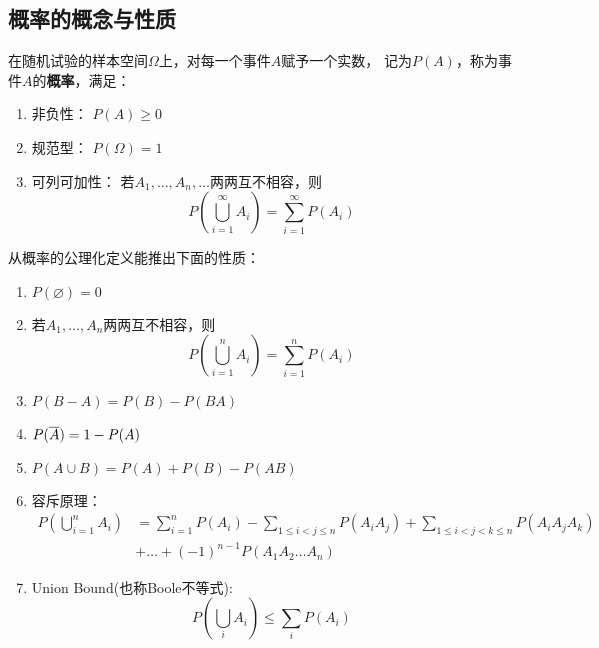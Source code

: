 \subsection{概率的概念与性质}
\begin{definition}[概率]
  在随机试验的样本空间$\Omega$上，对每一个事件$A$赋予一个实数，
  记为$P(A)$，称为事件$A$的\textbf{概率}，满足：
  \begin{enumerate}
    \item 非负性：
    $P(A)\ge 0$
    \item 规范型：
    $P(\Omega) = 1$
    \item 可列可加性：
    若$A_1,\dots,A_n,\dots$两两互不相容，则
    \begin{displaymath}
      P\left(\bigcup_{i=1}^\infty A_i\right)=\sum_{i=1}^\infty P(A_i)
    \end{displaymath}
  \end{enumerate}
\end{definition}

\begin{theorem}[概率的性质]
  从概率的公理化定义能推出下面的性质：
  \begin{enumerate}
    \item
    $P(\varnothing) = 0$
    \item
    若$A_1,\dots,A_n$两两互不相容，则
    \begin{displaymath}
    P\left(\bigcup_{i=1}^n A_i\right)=\sum_{i=1}^n P(A_i)
    \end{displaymath}
    \item 
    $P(B-A) = P(B) - P(BA)$
    \item
    $P(\overline{A}) = 1 - P(A)$
    \item 
    $P(A\cup B) = P(A) + P(B) - P(AB)$
    \item
    容斥原理：
    \begin{align*}
      P\left(\bigcup_{i=1}^n A_i\right) 
      &= \sum_{i=1}^n P(A_i) - \sum_{1\le i<j\le n} P(A_iA_j)
      + \sum_{1\le i<j<k\le n} P(A_iA_jA_k) \\
      &+ \dots + (-1)^{n-1}P(A_1A_2\dots A_n)
    \end{align*}
    \item 
    Union Bound(也称Boole不等式):
    \begin{displaymath}
      P\left(\bigcup_i A_i\right) \le \sum_i P(A_i)
    \end{displaymath}
  \end{enumerate}
\end{theorem}

